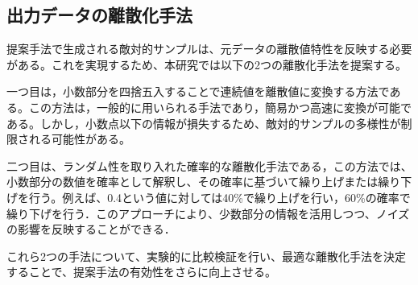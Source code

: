 \subsection{出力データの離散化手法}
提案手法で生成される敵対的サンプルは、元データの離散値特性を反映する必要がある。これを実現するため、本研究では以下の2つの離散化手法を提案する。

一つ目は，小数部分を四捨五入することで連続値を離散値に変換する方法である。この方法は，一般的に用いられる手法であり，簡易かつ高速に変換が可能である。しかし，小数点以下の情報が損失するため、敵対的サンプルの多様性が制限される可能性がある。

二つ目は、ランダム性を取り入れた確率的な離散化手法である，この方法では、小数部分の数値を確率として解釈し、その確率に基づいて繰り上げまたは繰り下げを行う。例えば、0.4という値に対しては40\%で繰り上げを行い，60\%の確率で繰り下げを行う．このアプローチにより、少数部分の情報を活用しつつ、ノイズの影響を反映することができる．

これら2つの手法について、実験的に比較検証を行い、最適な離散化手法を決定することで、提案手法の有効性をさらに向上させる。